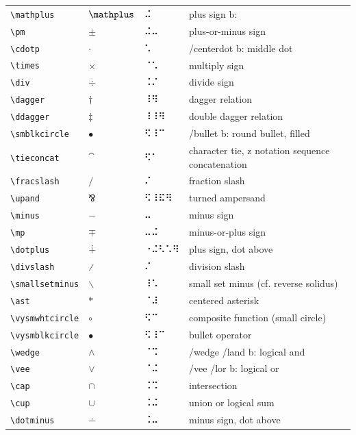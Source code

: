 \documentclass[oneside]{article}
\begin{document}
\begin{longtable}{llll}
\verb|\mathplus| & $\mathplus$ &  ⠬  & {plus sign b:} \\[2ex]
\verb|\pm| & $\pm$ &  ⠬⠤  & {plus-or-minus sign} \\[2ex]
\verb|\cdotp| & $\cdotp$ &  ⠡  & {/centerdot b: middle dot} \\[2ex]
\verb|\times| & $\times$ &  ⠈⠡  & {multiply sign} \\[2ex]
\verb|\div| & $\div$ &  ⠨⠌  & {divide sign} \\[2ex]
\verb|\dagger| & $\dagger$ &  ⠸⠻  & {dagger relation} \\[2ex]
\verb|\ddagger| & $\ddagger$ &  ⠸⠸⠻  & {double dagger relation} \\[2ex]
\verb|\smblkcircle| & $\smblkcircle$ &  ⠫⠸⠉  & {/bullet b: round bullet, filled} \\[2ex]
\verb|\tieconcat| & $\tieconcat$ &  ⠫⠁  & {character tie, z notation sequence concatenation} \\[2ex]
\verb|\fracslash| & $\fracslash$ &  ⠌  & {fraction slash} \\[2ex]
\verb|\upand| & $\upand$ &  ⠫⠸⠯⠻  & {turned ampersand} \\[2ex]
\verb|\minus| & $\minus$ &  ⠤  & {minus sign} \\[2ex]
\verb|\mp| & $\mp$ &  ⠤⠬  & {minus-or-plus sign} \\[2ex]
\verb|\dotplus| & $\dotplus$ &  ⠐⠬⠣⠡⠻  & {plus sign, dot above} \\[2ex]
\verb|\divslash| & $\divslash$ &  ⠌  & {division slash} \\[2ex]
\verb|\smallsetminus| & $\smallsetminus$ &  ⠸⠡  & {small set minus (cf. reverse solidus)} \\[2ex]
\verb|\ast| & $\ast$ &  ⠈⠼  & {centered asterisk} \\[2ex]
\verb|\vysmwhtcircle| & $\vysmwhtcircle$ &  ⠫⠉  & {composite function (small circle)} \\[2ex]
\verb|\vysmblkcircle| & $\vysmblkcircle$ &  ⠫⠸⠉  & {bullet operator} \\[2ex]
\verb|\wedge| & $\wedge$ &  ⠈⠩  & {/wedge /land b: logical and} \\[2ex]
\verb|\vee| & $\vee$ &  ⠈⠬  & {/vee /lor b: logical or} \\[2ex]
\verb|\cap| & $\cap$ &  ⠨⠩  & {intersection} \\[2ex]
\verb|\cup| & $\cup$ &  ⠨⠬  & {union or logical sum} \\[2ex]
\verb|\dotminus| & $\dotminus$ &  ⠨⠤  & {minus sign, dot above} \\[2ex]

\end{longtable}
\end{document}

